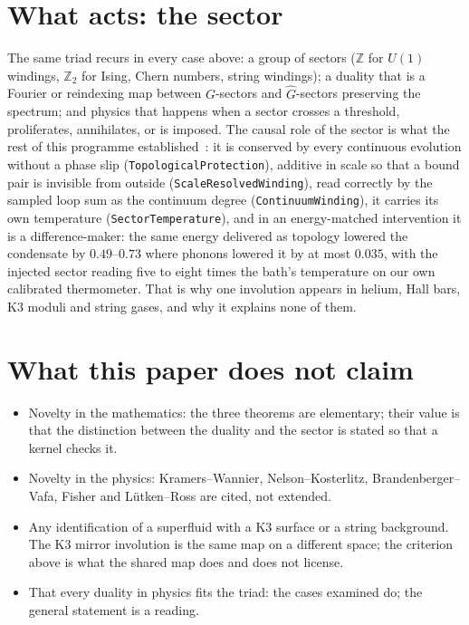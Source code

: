 \documentclass[11pt,a4paper]{article}
\newcommand{\lean}[1]{\texttt{\small #1}}
\begin{document}
\section{What acts: the sector}

The same triad recurs in every case above: a group of sectors ($\mathbb Z$ for $U(1)$ windings, $\mathbb Z_2$ for
Ising, Chern numbers, string windings); a duality that is a Fourier or reindexing map between $G$-sectors and
$\hat G$-sectors preserving the spectrum; and physics that happens when a sector crosses a threshold, proliferates,
annihilates, or is imposed. The causal role of the sector is what the rest of this programme
established~\cite{Callens2026Causal}: it is conserved by every continuous evolution without a phase slip
(\lean{TopologicalProtection}), additive in scale so that a bound pair is invisible from outside
(\lean{ScaleResolvedWinding}), read correctly by the sampled loop sum as the continuum degree
(\lean{ContinuumWinding}), it carries its own temperature (\lean{SectorTemperature}), and in an energy-matched
intervention it is a difference-maker: the same energy delivered as topology lowered the condensate by
$0.49$--$0.73$ where phonons lowered it by at most $0.035$, with the injected sector reading five to eight times
the bath's temperature on our own calibrated thermometer. That is why one involution appears in helium, Hall bars,
K3 moduli and string gases, and why it explains none of them.

\section{What this paper does not claim}
\begin{failbox}
\begin{itemize}[leftmargin=*]
\item Novelty in the mathematics: the three theorems are elementary; their value is that the distinction between
  the duality and the sector is stated so that a kernel checks it.
\item Novelty in the physics: Kramers--Wannier, Nelson--Kosterlitz, Brandenberger--Vafa, Fisher and Lütken--Ross
  are cited, not extended.
\item Any identification of a superfluid with a K3 surface or a string background. The K3 mirror involution is the
  same map on a different space; the criterion above is what the shared map does and does not license.
\item That every duality in physics fits the triad: the cases examined do; the general statement is a reading.
\end{itemize}
\end{failbox}
\end{document}

